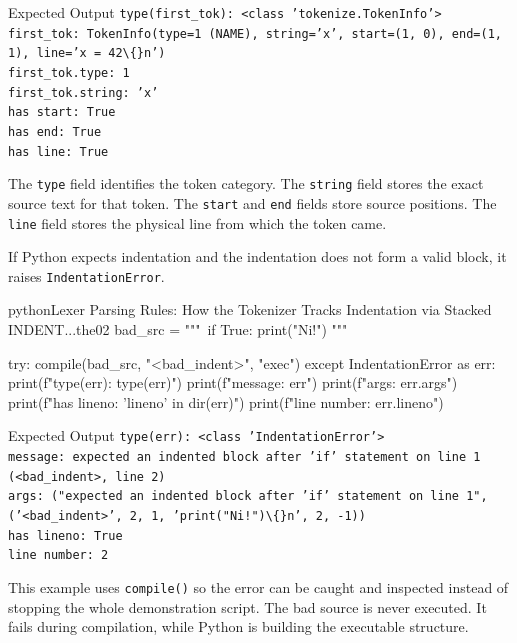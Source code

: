 \begin{iobox}{Expected Output}
\texttt{type(first\_tok): <class 'tokenize.TokenInfo'>} \\
\texttt{first\_tok: TokenInfo(type=1 (NAME), string='x', start=(1, 0), end=(1, 1), line='x = 42\textbackslash\{\}n')} \\
\texttt{first\_tok.type: 1} \\
\texttt{first\_tok.string: 'x'} \\
\texttt{has start: True} \\
\texttt{has end: True} \\
\texttt{has line: True} \\
\end{iobox}


The \texttt{type} field identifies the token category. The \texttt{string} field stores the exact source text for that token. The \texttt{start} and \texttt{end} fields store source positions. The \texttt{line} field stores the physical line from which the token came.

If Python expects indentation and the indentation does not form a valid block, it raises \texttt{IndentationError}.

\begin{codebox}[]{python}{Lexer Parsing Rules: How the Tokenizer Tracks Indentation via Stacked INDENT...}{the02}
bad_src = """\
if True:
print("Ni!")
"""

try:
    compile(bad_src, "<bad_indent>", "exec")
except IndentationError as err:
    print(f"type(err): {type(err)}")
    print(f"message: {err}")
    print(f"args: {err.args}")
    print(f"has lineno: {'lineno' in dir(err)}")
    print(f"line number: {err.lineno}")
\end{codebox}


\begin{iobox}{Expected Output}
\texttt{type(err): <class 'IndentationError'>} \\
\texttt{message: expected an indented block after 'if' statement on line 1 (<bad\_indent>, line 2)} \\
\texttt{args: ("expected an indented block after 'if' statement on line 1", ('<bad\_indent>', 2, 1, 'print("Ni!")\textbackslash\{\}n', 2, -1))} \\
\texttt{has lineno: True} \\
\texttt{line number: 2} \\
\end{iobox}


This example uses \texttt{compile()} so the error can be caught and inspected instead of stopping the whole demonstration script. The bad source is never executed. It fails during compilation, while Python is building the executable structure.

